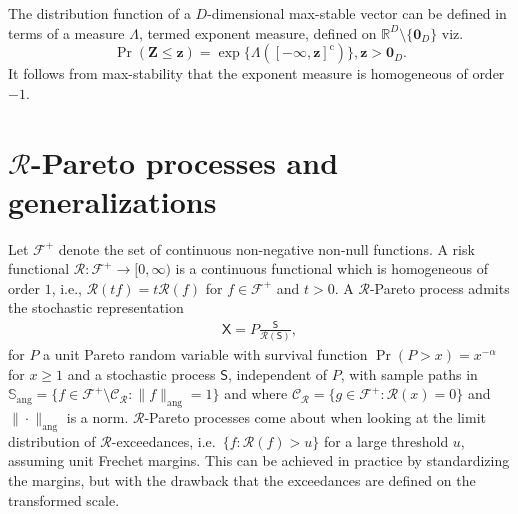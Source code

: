 \documentclass[]{book}
\begin{document}
The distribution function of a \(D\)-dimensional max-stable vector can be defined in terms of a measure \(\Lambda\), termed exponent measure, defined on \(\mathbb{R}^D \setminus\{\boldsymbol{0}_D\}\) viz.
\[\Pr(\boldsymbol{Z} \leq \boldsymbol{z}) = \exp\{\Lambda([-\boldsymbol{\infty}, \boldsymbol{z}]^\mathrm{c})\}, \boldsymbol{z} > \boldsymbol{0}_D.\]
It follows from max-stability that the exponent measure is homogeneous of order \(-1\).

\hypertarget{mathcalr-pareto-processes-and-generalizations}{%
\section{\texorpdfstring{\(\mathcal{R}\)-Pareto processes and generalizations}{\textbackslash mathcal\{R\}-Pareto processes and generalizations}}\label{mathcalr-pareto-processes-and-generalizations}}

Let \(\mathcal{F}^+\) denote the set of continuous non-negative non-null functions. A risk functional \(\mathcal{R}:\mathcal{F}^+ \to [0, \infty)\) is a continuous functional which is homogeneous of order \(1\), i.e., \(\mathcal{R}(tf) = t\mathcal{R}(f)\) for \(f \in \mathcal{F}^+\) and \(t>0\). A \(\mathcal{R}\)-Pareto process admits the stochastic representation \citep[\citet{Dombry/Ribatet:2015}]{Ferreira:2014}
\begin{align}
  \mathsf{X} = P \frac{\mathsf{S}}{\mathcal{R}(\mathsf{S})},
 \end{align}
for \(P\) a unit Pareto random variable with survival function \(\Pr(P>x) = x^{-\alpha}\) for \(x \geq 1\) and a stochastic process \(\mathsf{S}\), independent of \(P\), with sample paths in \(\mathbb{S}_{\mathrm{ang}} = \{f \in \mathcal{F}^+ \setminus \mathcal{C}_{\mathcal{R}}: \|f\|_{\mathrm{ang}} = 1\}\) and where \(\mathcal{C}_{\mathcal{R}} = \{g \in \mathcal{F}^+: \mathcal{R}(x)=0\}\) and \(\|\cdot\|_{\mathrm{ang}}\) is a norm. \(\mathcal{R}\)-Pareto processes come about when looking at the limit distribution of \(\mathcal{R}\)-exceedances, i.e.~\(\{f: \mathcal{R}(f) >u\}\) for a large threshold \(u\), assuming unit Frechet margins. This can be achieved in practice by standardizing the margins, but with the drawback that the exceedances are defined on the transformed scale.
\end{document}

